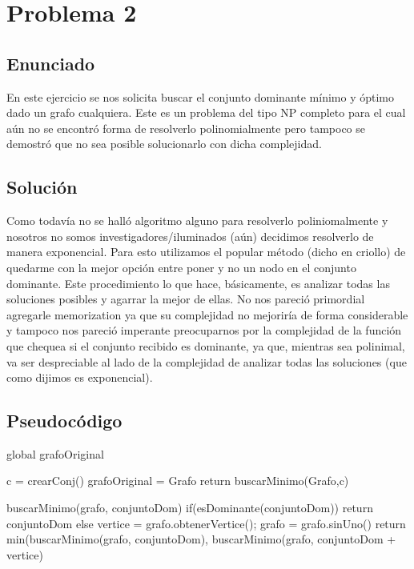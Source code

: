 \section{Problema 2}

\subsection{Enunciado}
En este ejercicio se nos solicita buscar el conjunto dominante mínimo y óptimo dado un grafo cualquiera. Este es un problema del tipo NP completo 
para el cual aún no se encontró forma de resolverlo polinomialmente pero tampoco se demostró que no sea posible solucionarlo con dicha complejidad.

\subsection{Soluci\'on}
Como todavía no se halló algoritmo alguno para resolverlo poliniomalmente y nosotros no somos investigadores/iluminados (aún) decidimos resolverlo
de manera exponencial. Para esto utilizamos el popular método (dicho en criollo) de quedarme con la mejor opción entre poner y no un nodo en el 
conjunto dominante. Este procedimiento lo que hace, básicamente, es analizar todas las soluciones posibles y agarrar la mejor de ellas. 
No nos pareció primordial agregarle memorization ya que su complejidad no mejoriría de forma considerable y tampoco nos pareció imperante 
preocuparnos por la complejidad de la función que chequea si el conjunto recibido es dominante, ya que, mientras sea polinimal, va ser despreciable 
al lado de la complejidad de analizar todas las soluciones (que como dijimos es exponencial).

\subsection{Pseudocódigo}

global grafoOriginal

\begin{codebox}
\li	c = crearConj()
\li	grafoOriginal = Grafo
\li	return buscarMinimo(Grafo,c)
\end{codebox}

buscarMinimo(grafo, conjuntoDom){
	if(esDominante(conjuntoDom)){
		return conjuntoDom
	}else{
		vertice = grafo.obtenerVertice(); 
		grafo = grafo.sinUno()
		return min(buscarMinimo(grafo, conjuntoDom), buscarMinimo(grafo, conjuntoDom + vertice)
	}
}

